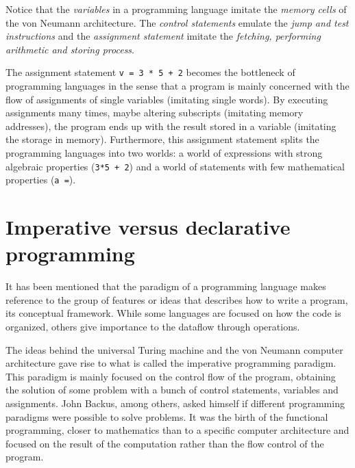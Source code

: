 Notice that the \textit{variables} in a programming language imitate the \textit{memory cells} of the von Neumann architecture.
The \textit{control statements} emulate the \textit{jump and test instructions} and
the \textit{assignment statement} imitate the \textit{fetching, performing arithmetic and storing process}. 

The assignment statement \texttt{v = 3 * 5 + 2} becomes the bottleneck of programming languages in the sense that a program is mainly concerned 
with the flow of assignments of single variables (imitating single words). 
By executing assignments many times, maybe altering subscripts (imitating memory addresses), 
the program ends up with the result stored in a variable (imitating the storage in memory). 
Furthermore, this assignment statement splits the programming languages into two worlds: 
a world of expressions with strong algebraic properties (\texttt{3*5 + 2}) and a world of statements with few mathematical properties (\texttt{a =}).





 
    \newpage
    \section{Imperative versus declarative programming}  \label{sec:impvsdec}
    \vspace{-.5cm}
It has been mentioned that the paradigm of a programming language makes reference to 
the group of features or ideas that describes how to write a program, its conceptual framework. 
While some languages are focused on how the code is organized, 
others give importance to the dataflow through operations.

The ideas behind the universal Turing machine and 
the von Neumann computer architecture gave rise 
to what is called the imperative programming paradigm. 
This paradigm is mainly focused on the control flow of the program,
obtaining the solution of some problem with a bunch of control statements,
variables and assignments. 
John Backus, among others, asked himself if different programming paradigms 
were possible to solve problems. 
It was the birth of the functional programming, closer to mathematics than to a specific computer 
architecture and focused on the result of the computation rather than the flow control of the program. 

